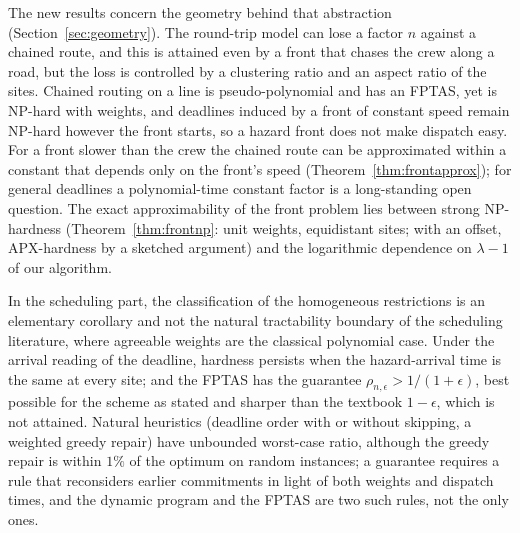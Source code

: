 \documentclass[pdflatex,sn-mathphys-ay]{sn-jnl}
\theoremstyle{thmstyleone}
\theoremstyle{thmstyletwo}
\theoremstyle{thmstylethree}
\begin{document}
The new results concern the geometry behind that abstraction
(Section~\ref{sec:geometry}). The round-trip model can lose a factor $n$
against a chained route, and this is attained even by a front that chases the
crew along a road, but the loss is controlled by a clustering ratio and an
aspect ratio of the sites. Chained routing on a line is pseudo-polynomial and
has an FPTAS, yet is NP-hard with weights, and deadlines induced by a front of
constant speed remain NP-hard however the front starts, so a hazard front does
not make dispatch easy. For a front slower than the crew the chained route can
be approximated within a constant that depends only on the front's speed
(Theorem~\ref{thm:frontapprox}); for general deadlines a polynomial-time
constant factor is a long-standing open question. The exact approximability of
the front problem lies between strong NP-hardness (Theorem~\ref{thm:frontnp}:
unit weights, equidistant sites; with an offset, APX-hardness by a sketched
argument) and the logarithmic dependence on $\lambda-1$ of our algorithm.

In the scheduling part, the classification of the homogeneous restrictions is
an elementary corollary and not the natural tractability boundary of the
scheduling literature, where agreeable weights are the classical polynomial
case. Under the arrival reading of the deadline, hardness persists when the
hazard-arrival time is the same at every site; and the FPTAS has the
guarantee $\rho_{n,\epsilon}>1/(1+\epsilon)$, best possible for the scheme as
stated and sharper than the textbook $1-\epsilon$, which is not attained.
Natural heuristics (deadline order with or without skipping, a weighted greedy
repair) have unbounded worst-case ratio, although the greedy repair is within
$1\%$ of the optimum on random instances; a guarantee requires a rule that
reconsiders earlier commitments in light of both weights and dispatch times,
and the dynamic program and the FPTAS are two such rules, not the only ones.
\end{document}
